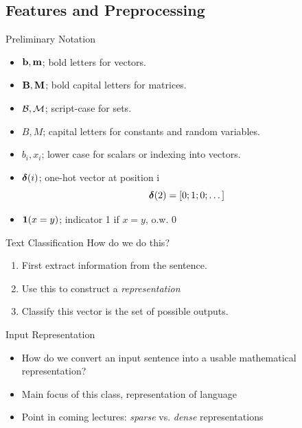 \documentclass{beamer}
\begin{document}
\subsection{Features and Preprocessing}

\begin{frame}{Preliminary Notation}
  \begin{itemize}
  \item $\mathbf{b}, \mathbf{m}$;  bold letters for vectors.
  \item $\mathbf{B}, \mathbf{M}$;  bold capital letters for matrices.
  \item $\mathcal{B}, \mathcal{M}$;  script-case for sets.
  \item $B, M$; capital letters for constants and random variables.
  \item $b_i, x_i$; lower case for scalars or indexing into vectors.
  \end{itemize}


  \begin{itemize}
  \item $\boldsymbol{\delta}(i)$; one-hot vector at position i
    \[\boldsymbol{\delta}(2) = \left[ 0; 1; 0; \dots \right]\] 
  \item $\mathbf{1}(x = y)$; indicator 1 if $x = y$, o.w. 0

  \end{itemize}


\end{frame}


\begin{frame}{Text Classification}
  How do we do this? 

  \begin{enumerate}
  \item First extract information from the sentence. 
  \item Use this to construct a \textit{representation}
  \item Classify this vector is the set of possible outputs.
  \end{enumerate}

\end{frame}





\begin{frame}{Input Representation}
  \begin{itemize}
  \item How do we convert an input sentence into a usable mathematical representation?
  \item Main focus of this class, representation of language
  \item Point in coming lectures: \textit{sparse} vs. \textit{dense} representations
  \end{itemize}
\end{frame}
\end{document}
